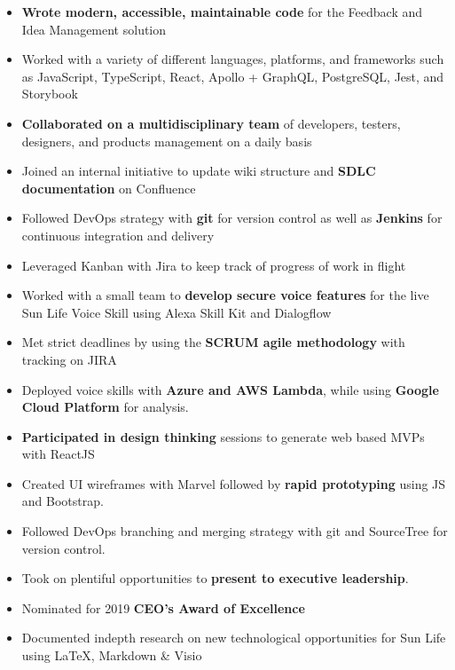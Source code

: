 \documentclass[10pt,a4paper]{altacv}
\begin{document}
\tagline{}


\begin{fullwidth}
\makecvheader
\bigskip
\end{fullwidth}

\begin{itemize}  
\item \textbf{Wrote modern, accessible, maintainable code} for the Feedback and Idea Management solution
\item Worked with a variety of different languages, platforms, and frameworks such as JavaScript, TypeScript, React, Apollo + GraphQL, PostgreSQL, Jest, and Storybook
\item \textbf{Collaborated on a multidisciplinary team} of developers, testers, designers, and products management on a daily basis 
\item Joined an internal initiative to update wiki structure and \textbf{SDLC documentation} on Confluence
\item Followed DevOps strategy with \textbf{git} for version control as well as \textbf{Jenkins} for continuous integration and delivery
\item Leveraged Kanban with Jira to keep track of progress of work in flight
\end{itemize}

\divider

\begin{itemize}  
\item Worked with a small team to \textbf{develop secure voice features} for the live Sun Life Voice Skill using Alexa Skill Kit and Dialogflow
\item Met strict deadlines by using the \textbf{SCRUM agile methodology} with tracking on JIRA
\item Deployed voice skills with \textbf{Azure and AWS Lambda}, while using \textbf{Google Cloud Platform} for analysis.
\item \textbf{Participated in design thinking} sessions to generate web based MVPs with ReactJS
\item Created UI wireframes with Marvel followed by \textbf{rapid prototyping} using JS and Bootstrap.
\item Followed DevOps branching and merging strategy with git and SourceTree for version control. 
\item Took on plentiful opportunities to \textbf{present to executive leadership}.
\item Nominated for 2019 \textbf{CEO's Award of Excellence} 
\item Documented indepth research on new technological opportunities for Sun Life using \LaTeX, Markdown \& Visio
\end{itemize}
\end{document}
